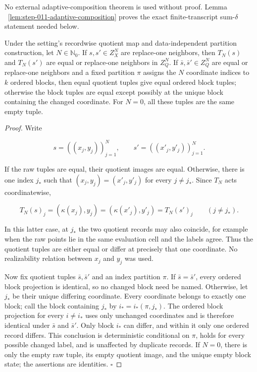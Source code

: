 No external adaptive-composition theorem is used without proof. Lemma
~\ref{lem:step-011-adaptive-composition} proves the exact finite-transcript
sum-\(\delta\) statement needed below.



\begin{lemma}\label{lem:step-011-record-locality}
Under the setting's recordwise quotient map and data-independent partition
construction, let \(N\in\mathbb N_0\). If \(s,s'\in Z_X^N\) are replace-one
neighbors, then \(T_N(s)\) and \(T_N(s')\) are equal or replace-one neighbors
in \(Z_Q^N\). If \(\bar s,\bar s'\in Z_Q^N\) are equal or replace-one
neighbors and a fixed partition \(\pi\) assigns the \(N\) coordinate indices
to \(k\) ordered blocks, then equal quotient tuples give equal ordered block
tuples; otherwise the block tuples are equal except possibly at the unique
block containing the changed coordinate. For \(N=0\), all these tuples are
the same empty tuple.


\end{lemma}

\begin{proof}
Write

\[
 s=((x_j,y_j))_{j=1}^N,
 \qquad
 s'=((x'_j,y'_j))_{j=1}^N.
\]

If the raw tuples are equal, their quotient images are equal. Otherwise,
there is one index \(j_*\) such that
\((x_j,y_j)=(x'_j,y'_j)\) for every \(j\ne j_*\). Since \(T_N\) acts
coordinatewise,

\[
 T_N(s)_j=(\kappa(x_j),y_j)
          =(\kappa(x'_j),y'_j)=T_N(s')_j
 \qquad(j\ne j_*).
\tag{12}
\]

In this latter case, at \(j_*\) the two quotient records may also coincide,
for example when
the raw points lie in the same evaluation cell and the labels agree. Thus
the quotient tuples are either equal or differ at precisely that one
coordinate. No realizability relation between \(x_j\) and \(y_j\) was used.

Now fix quotient tuples \(\bar s,\bar s'\) and an index partition \(\pi\). If
\(\bar s=\bar s'\), every ordered block projection is identical, so no
changed block need be named. Otherwise, let \(j_*\) be their unique differing
coordinate. Every coordinate belongs to exactly one block; call the block
containing \(j_*\) by \(i_*=i_*(\pi,j_*)\). The
ordered block projection for every \(i\ne i_*\) uses only unchanged
coordinates and is therefore identical under \(\bar s\) and \(\bar s'\).
Only block \(i_*\) can differ, and within it only one ordered record differs.
This conclusion is deterministic conditional on \(\pi\), holds for every
possible changed label, and is unaffected by duplicate records. If \(N=0\),
there is only the empty raw tuple, its empty quotient image, and the unique
empty block state; the assertions are identities. \(\square\)


\end{proof}

